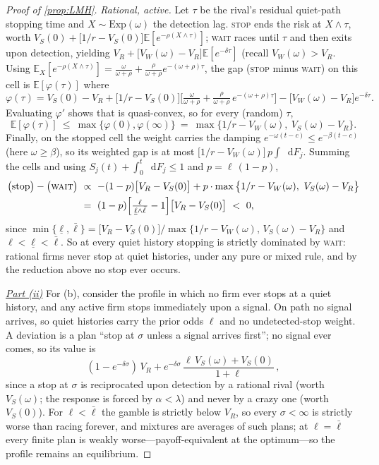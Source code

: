 \documentclass[12pt,reqno]{article}
\newcommand{\de}{\mathop{}\!\mathrm{d}}
\newcommand{\Ex}{\mathbb{E}}
\theoremstyle{definition} \newtheorem{example}{Example}
\theoremstyle{definition} \newtheorem{condition}{Condition}
\theoremstyle{definition} \newtheorem{corollary}{Corollary}
\theoremstyle{definition} \newtheorem{claim}{Claim}
\theoremstyle{definition} \newtheorem{definition}{Definition}
\theoremstyle{definition} \newtheorem{conjecture}{Conjecture}
\theoremstyle{definition} \newtheorem{Lemma}{Lemma}
\theoremstyle{definition} \newtheorem{lemma}{Lemma}
\theoremstyle{plain} \newtheorem{theorem}{Theorem}
\theoremstyle{definition} \newtheorem{assumption}{Assumption}
\theoremstyle{definition} \newtheorem*{assumptionnonumber}{Assumption}
\theoremstyle{definition} \newtheorem*{theoremNoNumber}{Proposition}
\theoremstyle{definition}
\theoremstyle{definition}\newtheorem{proposition}{Proposition}
\theoremstyle{definition} \newtheorem{result}{Result}
\theoremstyle{definition} \newtheorem*{definitionNoNumber}{Definition}
\theoremstyle{definition} \newtheorem{Definition}{Definition}
\theoremstyle{definition} \newtheorem*{DefinitionNoNumber}{Definition}
\theoremstyle{definition} \newtheorem*{fact}{Fact}
\theoremstyle{definition} \newtheorem*{property}{Property}
\theoremstyle{definition} \newtheorem{remark}{Remark}
\begin{document}
\begin{proof}[Proof of \cref{prop:LMH}]
\noindent  \emph{Rational, active.} Let $\tau$ be the rival's residual quiet-path stopping time  and $X\sim\mathrm{Exp}(\omega)$ the detection lag. \textsc{stop} ends the risk at $X\wedge\tau$, worth $V_S(0)+\big[1/r-V_S(0)\big]\Ex[e^{-\rho(X\wedge\tau)}]$; \textsc{wait} races until $\tau$ and then exits upon detection, yielding $V_R+\big[V_W(\omega)-V_R\big]\Ex[e^{-\delta\tau}]$ (recall $V_W(\omega)>V_R$. Using $\Ex_X[e^{-\rho(X\wedge\tau)}]=\frac{\omega}{\omega+\rho}+\frac{\rho}{\omega+\rho}e^{-(\omega+\rho)\tau}$, the gap (\textsc{stop} minus \textsc{wait}) on this cell is $\Ex[\varphi(\tau)]$ where
\[
\varphi(\tau)=V_S(0)-V_R+\big[1/r-V_S(0)\big]\Big[\tfrac{\omega}{\omega+\rho}+\tfrac{\rho}{\omega+\rho}\,e^{-(\omega+\rho)\tau}\Big]-\big[V_W(\omega)-V_R\big]e^{-\delta\tau}.\]
Evaluating $\varphi'$  shows that is quasi-convex, so for every (random) $\tau$,
\[
\Ex[\varphi(\tau)]\ \le\ \max\{\varphi(0),\varphi(\infty)\}\ =\ \max\big\{1/r-V_W(\omega),\ V_S(\omega)-V_R\big\} .
\]
Finally, on the stopped cell the weight carries the damping $e^{-\omega(t-c)}\le e^{-\beta(t-c)}$ (here $\omega\ge\beta$), so its weighted gap is at most $\big[1/r-V_W(\omega)\big]\,p\!\int\de F_j$. Summing the cells and using $S_j(t)+\int_0^t\de F_j\le1$ and $p=\ell\,(1-p)$,
\begin{align*}
\big(\text{stop}\big)-\big(\textsc{wait}\big)\ &\propto\ -(1-p)\big[V_R-V_S(0)\big]+p\cdot\max\big\{1/r-V_W(\omega),\ V_S(\omega)-V_R\big\}\\
&=\ (1-p)\Big[\tfrac{\ell}{\,\underline\ell\wedge\bar\ell\,}-1\Big]\big[V_R-V_S(0)\big]\ <\ 0 ,
\end{align*}
since $\min\{\underline\ell,\bar\ell\}=\big[V_R-V_S(0)\big]/\max\{1/r-V_W(\omega),\,V_S(\omega)-V_R\}$ and $\ell<\underline\ell<\bar\ell$. So at every quiet history  stopping is strictly dominated by \textsc{wait}: rational firms never stop at quiet histories, under any pure or mixed rule, and by the reduction above no stop ever occurs.

\noindent  \underline{\emph{Part (ii)}} For (b), consider the profile in which no firm ever stops at a quiet history, and any active firm stops immediately upon a signal. On path no signal arrives, so quiet histories carry the prior odds $\ell$ and no undetected-stop weight. A deviation is a plan ``stop at $\sigma$ unless a signal arrives first''; no signal ever comes, so its value is
\[
(1-e^{-\delta\sigma})\,V_R+e^{-\delta\sigma}\,\frac{\ell\, V_S(\omega)+V_S(0)}{1+\ell}\,,
\]
since a stop at $\sigma$ is reciprocated upon detection by a rational rival (worth $V_S(\omega)$; the response is forced by $\alpha<\lambda$) and never by a crazy one (worth $V_S(0)$). For $\ell<\bar\ell$ the gamble is strictly below $V_R$, so every $\sigma<\infty$ is strictly worse than racing forever, and mixtures are averages of such plans; at $\ell=\bar\ell$ every finite plan is weakly worse---payoff-equivalent at the optimum---so the profile remains an equilibrium.


\end{proof}
\end{document}
